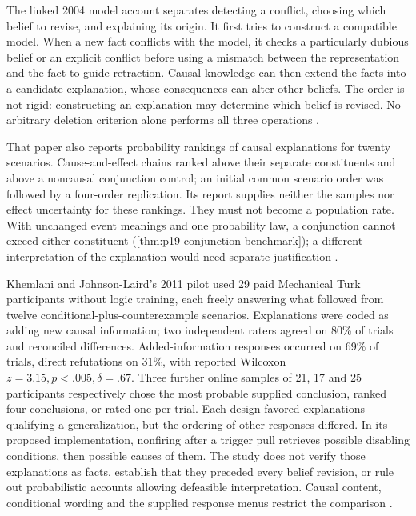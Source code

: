 The linked 2004 model account separates detecting a conflict, choosing
which belief to revise, and explaining its origin. It first tries to
construct a compatible model. When a new fact conflicts with the model,
it checks a particularly dubious belief or an explicit conflict before
using a mismatch between the representation and the fact to guide
retraction. Causal knowledge can then extend the facts into a candidate
explanation, whose consequences can alter other beliefs. The order is
not rigid: constructing an explanation may determine which belief is
revised. No arbitrary deletion criterion alone performs all three
operations \cite[pp.~640--642]{JohnsonLairdGirottoLegrenzi2004Consistency}.

That paper also reports probability rankings of causal explanations
for twenty scenarios. Cause-and-effect chains ranked above their
separate constituents and above a noncausal conjunction control; an
initial common scenario order was followed by a four-order replication.
Its report supplies neither the samples nor effect uncertainty for
these rankings. They must not become a population rate. With unchanged
event meanings and one probability law, a conjunction cannot exceed
either constituent (\cref{thm:p19-conjunction-benchmark}); a different
interpretation of the explanation would need separate justification
\cite[pp.~654--655]{JohnsonLairdGirottoLegrenzi2004Consistency}.

Khemlani and Johnson-Laird's 2011 pilot used 29 paid Mechanical Turk
participants without logic training, each freely answering what followed
from twelve conditional-plus-counterexample scenarios. Explanations were
coded as adding new causal information; two independent raters agreed on
80\% of trials and reconciled differences. Added-information responses
occurred on 69\% of trials, direct refutations on 31\%, with reported
Wilcoxon \(z=3.15,p<.005,\delta=.67\). Three further online samples
of 21, 17 and 25 participants respectively chose the most probable
supplied conclusion, ranked four conclusions, or rated one per trial.
Each design favored explanations qualifying a generalization, but the
ordering of other responses differed. In its proposed implementation,
nonfiring after a trigger pull retrieves possible disabling conditions,
then possible causes of them. The study does not verify those explanations
as facts, establish that they preceded every belief revision, or rule out
probabilistic accounts allowing defeasible interpretation. Causal content,
conditional wording and the supplied response menus restrict the
comparison \cite[early-online pp.~3--9]{KhemlaniJohnsonLaird2011Explain}.

